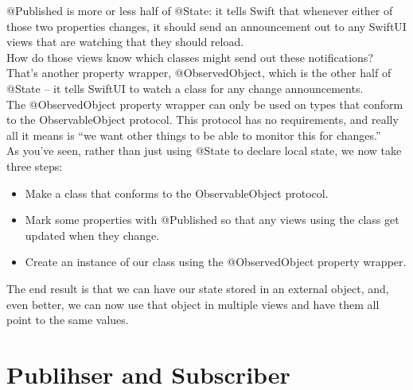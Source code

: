 \documentclass[a4paper,12pt]{article}
\begin{document}
@Published is more or less half of @State: it tells Swift that whenever either of those two properties changes, it should send an announcement out to any SwiftUI views that are watching that they should reload.\\

How do those views know which classes might send out these notifications? That’s another property wrapper, @ObservedObject, which is the other half of @State – it tells SwiftUI to watch a class for any change announcements.\\

The @ObservedObject property wrapper can only be used on types that conform to the ObservableObject protocol. This protocol has no requirements, and really all it means is “we want other things to be able to monitor this for changes.”\\

As you’ve seen, rather than just using @State to declare local state, we now take three steps:\\

\begin{itemize}
\item Make a class that conforms to the ObservableObject protocol.\\
\item Mark some properties with @Published so that any views using the class get updated when they change.\\
\item Create an instance of our class using the @ObservedObject property wrapper.\\
\end{itemize}

The end result is that we can have our state stored in an external object, and, even better, we can now use that object in multiple views and have them all point to the same values.\\
\newpage

\section{Publihser and Subscriber}
\label{sec:org54043e1}
\end{document}

